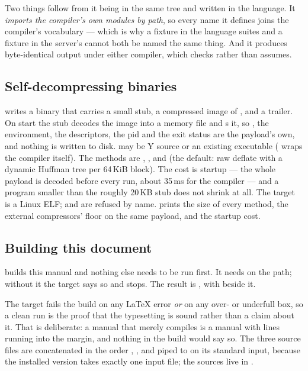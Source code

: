Two things follow from it being in the same tree and written in the language.
It \emph{imports the compiler's own modules by path}, so every name it defines
joins the compiler's vocabulary --- which is why a fixture in the language
suites and a fixture in the server's cannot both be named the same thing. And
it produces byte-identical output under either compiler, which 
checks rather than assumes.

\subsection{Self-decompressing binaries}

 writes a binary that carries a small stub, a
compressed image of , and a trailer. On start the stub decodes the
image into a memory file and s it, so , the environment,
the descriptors, the pid and the exit status are the payload's own, and
nothing is written to disk.  may be \textsf{Y} source or an existing
executable ( wraps the compiler itself). The methods are
, ,  and  (the default: raw deflate
with a dynamic Huffman tree per 64\,KiB block). The cost is startup --- the
whole payload is decoded before every run, about 35\,ms for the compiler ---
and a program smaller than the roughly 20\,KB stub does not shrink at all.
The target is a Linux ELF;  and  are
refused by name.  prints the size of every method, the
external compressors' floor on the same payload, and the startup cost.

\subsection{Building this document}

 builds this manual and nothing else needs to be run first. It
needs  on the path; without it the target says so and stops. The
result is , with  beside it.

The target fails the build on any \LaTeX{} error \emph{or} on any over- or
underfull box, so a clean run is the proof that the typesetting is sound rather
than a claim about it. That is deliberate: a manual that merely compiles is a
manual with lines running into the margin, and nothing in the build would say
so. The three source files are concatenated in the order ,
,  and piped to  on its standard
input, because the installed version takes exactly one input file; the sources
live in .
